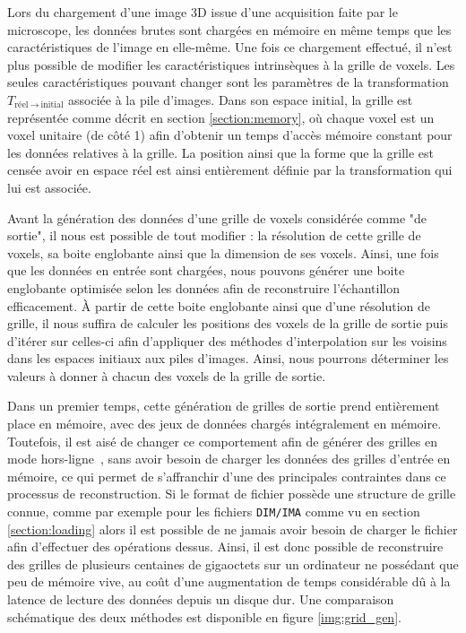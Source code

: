 {{{            Lors du chargement d'une image 3D issue d'une acquisition faite par le microscope, les données brutes sont chargées en mémoire en même temps que les caractéristiques de l'image en elle-même. Une fois ce chargement effectué, il n'est plus possible de modifier les caractéristiques intrinsèques à la grille de voxels. Les seules caractéristiques pouvant changer sont les paramètres de la transformation $T_{\text{réel}~\rightarrow~\text{initial}}$ associée à la pile d'images. Dans son espace initial, la grille est représentée comme décrit en section \ref{section:memory}, où chaque voxel est un voxel unitaire (de côté 1) afin d'obtenir un temps d'accès mémoire constant pour les données relatives à la grille. La position ainsi que la forme que la grille est censée avoir en espace réel est ainsi entièrement définie par la transformation qui lui est associée.

            Avant la génération des données d'une grille de voxels considérée comme "de sortie", il nous est possible de tout modifier : la résolution de cette grille de voxels, sa boite englobante ainsi que la dimension de ses voxels. Ainsi, une fois que les données en entrée sont chargées, nous pouvons générer une boite englobante optimisée selon les données afin de reconstruire l'échantillon efficacement. À partir de cette boite englobante ainsi que d'une résolution de grille, il nous suffira de calculer les positions des voxels de la grille de sortie puis d'itérer sur celles-ci afin d'appliquer des méthodes d'interpolation sur les voisins dans les espaces initiaux aux piles d'images. Ainsi, nous pourrons déterminer les valeurs à donner à chacun des voxels de la grille de sortie.
	        
            Dans un premier temps, cette génération de grilles de sortie prend entièrement place en mémoire, avec des jeux de données chargés intégralement en mémoire. Toutefois, il est aisé de changer ce comportement afin de générer des grilles en mode \og{}hors-ligne~\fg, sans avoir besoin de charger les données des grilles d'entrée en mémoire, ce qui permet de s'affranchir d'une des principales contraintes dans ce processus de reconstruction. Si le format de fichier possède une structure de grille connue, comme par exemple pour les fichiers \texttt{DIM/IMA} comme vu en section \ref{section:loading} alors il est possible de ne jamais avoir besoin de charger le fichier afin d'effectuer des opérations dessus. Ainsi, il est donc possible de reconstruire des grilles de plusieurs centaines de gigaoctets sur un ordinateur ne possédant que peu de mémoire vive, au coût d'une augmentation de temps considérable dû à la latence de lecture des données depuis un disque dur. Une comparaison schématique des deux méthodes est disponible en figure \ref{img:grid_gen}. %

}}}
